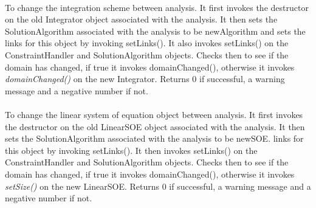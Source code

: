 \\
To change the integration scheme between analysis. It first invokes the
destructor on the old Integrator object associated with the
analysis. It then sets the SolutionAlgorithm 
associated with the analysis to be \p newAlgorithm and sets the
links for this object by invoking setLinks(). It also invokes
setLinks() on the ConstraintHandler and SolutionAlgorithm
objects. Checks then to see if the domain has changed, if true it
invokes domainChanged(), otherwise it invokes {\em
domainChanged()} on the new Integrator. Returns $0$ if
successful, a warning message and a negative number if not.\\

\\
To change the linear system of equation object between analysis. It
first invokes the destructor on the old LinearSOE object associated
with the analysis. It then sets the SolutionAlgorithm 
associated with the analysis to be \p newSOE.
links for this object by invoking setLinks(). It then invokes
setLinks() on the ConstraintHandler and SolutionAlgorithm
objects. Checks then to see if the domain has changed, if true it
invokes domainChanged(), otherwise it invokes {\em
setSize()} on the new LinearSOE. Returns $0$ if successful, a warning
message and a negative number if not.\\ 

